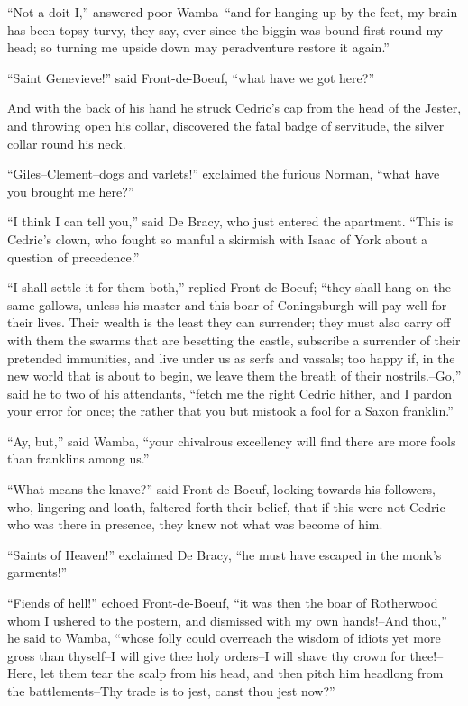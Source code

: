 ``Not a doit I,'' answered poor Wamba--``and for hanging up by the feet,
my brain has been topsy-turvy, they say, ever since the biggin was bound
first round my head; so turning me upside down may peradventure restore
it again.''

``Saint Genevieve!'' said Front-de-Boeuf, ``what have we got here?''

And with the back of his hand he struck Cedric's cap from the head of
the Jester, and throwing open his collar, discovered the fatal badge of
servitude, the silver collar round his neck.

``Giles--Clement--dogs and varlets!'' exclaimed the furious Norman,
``what have you brought me here?''

``I think I can tell you,'' said De Bracy, who just entered the
apartment. ``This is Cedric's clown, who fought so manful a skirmish
with Isaac of York about a question of precedence.''

``I shall settle it for them both,'' replied Front-de-Boeuf; ``they
shall hang on the same gallows, unless his master and this boar of
Coningsburgh will pay well for their lives. Their wealth is the least
they can surrender; they must also carry off with them the swarms that
are besetting the castle, subscribe a surrender of their pretended
immunities, and live under us as serfs and vassals; too happy if, in the
new world that is about to begin, we leave them the breath of their
nostrils.--Go,'' said he to two of his attendants, ``fetch me the right
Cedric hither, and I pardon your error for once; the rather that you but
mistook a fool for a Saxon franklin.''

``Ay, but,'' said Wamba, ``your chivalrous excellency will find there
are more fools than franklins among us.''

``What means the knave?'' said Front-de-Boeuf, looking towards his
followers, who, lingering and loath, faltered forth their belief, that
if this were not Cedric who was there in presence, they knew not what
was become of him.

``Saints of Heaven!'' exclaimed De Bracy, ``he must have escaped in the
monk's garments!''

``Fiends of hell!'' echoed Front-de-Boeuf, ``it was then the boar of
Rotherwood whom I ushered to the postern, and dismissed with my own
hands!--And thou,'' he said to Wamba, ``whose folly could overreach the
wisdom of idiots yet more gross than thyself--I will give thee holy
orders--I will shave thy crown for thee!--Here, let them tear the scalp
from his head, and then pitch him headlong from the battlements--Thy
trade is to jest, canst thou jest now?''

